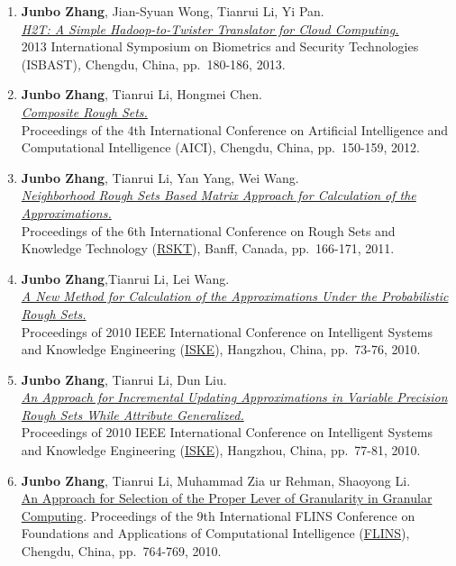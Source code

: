 \documentclass[10pt,a4paper]{article}
\begin{document}
\begin{enumerate}
{  Eighth International Conference on Rough Sets and Knowledge Technology
  (RSKT)}, Halifax, Canada, pp. 240-250, 2013.
\item
  \textbf{Junbo Zhang}, Jian-Syuan Wong, Tianrui Li, Yi Pan.\\
  \href{http://dx.doi.org/10.1109/ISBAST.2013.32}{\emph{H2T: A Simple
  Hadoop-to-Twister Translator for Cloud Computing.}}\\ 2013
  International Symposium on Biometrics and Security Technologies
  (ISBAST)\emph{,} Chengdu, China, pp.~180-186, 2013.
\item
  \textbf{Junbo Zhang}, Tianrui Li, Hongmei Chen.\\
  \href{http://www.springerlink.com/content/g621611026534074/?MUD=MP}{\emph{Composite
  Rough Sets.}}\\ Proceedings of the 4th International Conference on
  Artificial Intelligence and Computational Intelligence (AICI),
  Chengdu, China, pp.~150-159, 2012.
\item
  \textbf{Junbo Zhang}, Tianrui Li, Yan Yang, Wei Wang.\\
  \href{http://dx.doi.org/10.1007/978-3-642-24425-4_23}{\emph{Neighborhood
  Rough Sets Based Matrix Approach for Calculation of the
  Approximations.}}\\ Proceedings of the 6th International Conference on
  Rough Sets and Knowledge Technology
  (\href{http://rskt.cs.uregina.ca}{RSKT}), Banff, Canada, pp.~166-171,
  2011.
\item
  \textbf{Junbo Zhang},Tianrui Li, Lei Wang.\\
  \href{http://dx.doi.org/10.1109/ISKE.2010.5680797}{\emph{A New Method
  for Calculation of the Approximations Under the Probabilistic Rough
  Sets.}}\\ Proceedings of 2010 IEEE International Conference on
  Intelligent Systems and Knowledge Engineering
  (\href{http://ieeexplore.ieee.org/xpl/mostRecentIssue.jsp?punumber=5676709}{ISKE}),
  Hangzhou, China, pp.~73-76, 2010.
\item
  \textbf{Junbo Zhang}, Tianrui Li, Dun Liu.\\
  \href{http://dx.doi.org/10.1109/ISKE.2010.5680798}{\emph{An Approach
  for Incremental Updating Approximations in Variable Precision Rough
  Sets While Attribute Generalized.}}\\ Proceedings of 2010 IEEE
  International Conference on Intelligent Systems and Knowledge
  Engineering
  (\href{http://ieeexplore.ieee.org/xpl/mostRecentIssue.jsp?punumber=5676709}{ISKE}),
  Hangzhou, China, pp.~77-81, 2010.
\item
  \textbf{Junbo Zhang}, Tianrui Li, Muhammad Zia ur Rehman, Shaoyong
  Li.\\ \href{http://dx.doi.org/10.1142/9789814324700_0116}{An Approach
  for Selection of the Proper Lever of Granularity in Granular
  Computing}. Proceedings of the 9th International FLINS Conference on
  Foundations and Applications of Computational Intelligence
  (\href{http://www.wikicfp.com/cfp/servlet/event.showcfp?eventid=7359\&copyownerid=2}{FLINS}),
  Chengdu, China, pp.~764-769, 2010.
\end{enumerate}
\end{document}
